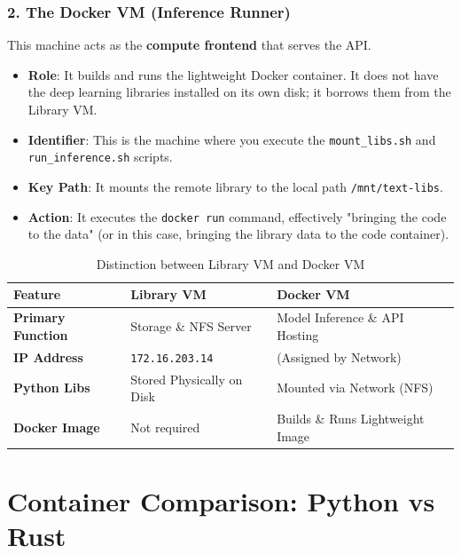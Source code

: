 \documentclass[11pt,a4paper]{article}
\begin{document}
\subsubsection{2. The Docker VM (Inference Runner)}
This machine acts as the \textbf{compute frontend} that serves the API.
\begin{itemize}
    \item \textbf{Role}: It builds and runs the lightweight Docker container. It does not have the deep learning libraries installed on its own disk; it borrows them from the Library VM.
    \item \textbf{Identifier}: This is the machine where you execute the \texttt{mount\_libs.sh} and \texttt{run\_inference.sh} scripts.
    \item \textbf{Key Path}: It mounts the remote library to the local path \texttt{/mnt/text-libs}.
    \item \textbf{Action}: It executes the \texttt{docker run} command, effectively "bringing the code to the data" (or in this case, bringing the library data to the code container).
\end{itemize}

\begin{table}[h]
\centering
\begin{tabular}{|l|l|l|}
\hline
\textbf{Feature} & \textbf{Library VM} & \textbf{Docker VM} \\ \hline
\textbf{Primary Function} & Storage \& NFS Server & Model Inference \& API Hosting \\ \hline
\textbf{IP Address} & \texttt{172.16.203.14} & (Assigned by Network) \\ \hline
\textbf{Python Libs} & Stored Physically on Disk & Mounted via Network (NFS) \\ \hline
\textbf{Docker Image} & Not required & Builds \& Runs Lightweight Image \\ \hline
\end{tabular}
\caption{Distinction between Library VM and Docker VM}
\end{table}




\newpage

\section{Container Comparison: Python vs Rust}
\end{document}
